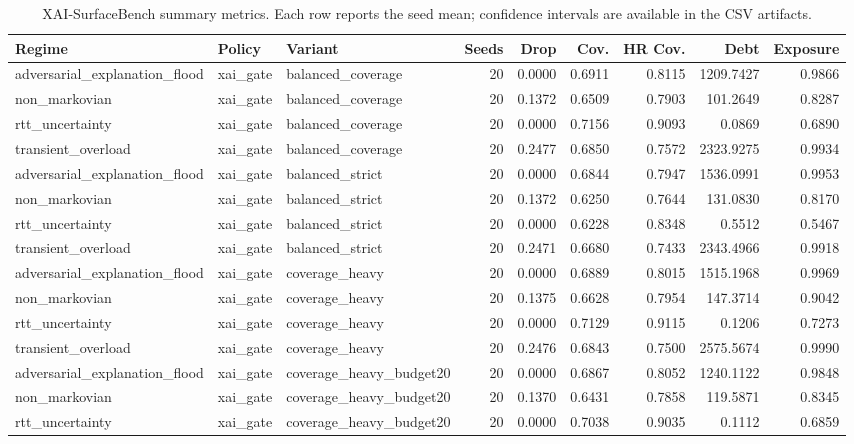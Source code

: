 \begin{table}[t]
\centering
\scriptsize
\caption{XAI-SurfaceBench summary metrics. Each row reports the seed mean; confidence intervals are available in the CSV artifacts.}
\begin{tabular}{lllrrrrrr}
\toprule
Regime & Policy & Variant & Seeds & Drop & Cov. & HR Cov. & Debt & Exposure \\
\midrule
adversarial\_explanation\_flood & xai\_gate & balanced\_coverage & 20 & 0.0000 & 0.6911 & 0.8115 & 1209.7427 & 0.9866 \\
non\_markovian & xai\_gate & balanced\_coverage & 20 & 0.1372 & 0.6509 & 0.7903 & 101.2649 & 0.8287 \\
rtt\_uncertainty & xai\_gate & balanced\_coverage & 20 & 0.0000 & 0.7156 & 0.9093 & 0.0869 & 0.6890 \\
transient\_overload & xai\_gate & balanced\_coverage & 20 & 0.2477 & 0.6850 & 0.7572 & 2323.9275 & 0.9934 \\
adversarial\_explanation\_flood & xai\_gate & balanced\_strict & 20 & 0.0000 & 0.6844 & 0.7947 & 1536.0991 & 0.9953 \\
non\_markovian & xai\_gate & balanced\_strict & 20 & 0.1372 & 0.6250 & 0.7644 & 131.0830 & 0.8170 \\
rtt\_uncertainty & xai\_gate & balanced\_strict & 20 & 0.0000 & 0.6228 & 0.8348 & 0.5512 & 0.5467 \\
transient\_overload & xai\_gate & balanced\_strict & 20 & 0.2471 & 0.6680 & 0.7433 & 2343.4966 & 0.9918 \\
adversarial\_explanation\_flood & xai\_gate & coverage\_heavy & 20 & 0.0000 & 0.6889 & 0.8015 & 1515.1968 & 0.9969 \\
non\_markovian & xai\_gate & coverage\_heavy & 20 & 0.1375 & 0.6628 & 0.7954 & 147.3714 & 0.9042 \\
rtt\_uncertainty & xai\_gate & coverage\_heavy & 20 & 0.0000 & 0.7129 & 0.9115 & 0.1206 & 0.7273 \\
transient\_overload & xai\_gate & coverage\_heavy & 20 & 0.2476 & 0.6843 & 0.7500 & 2575.5674 & 0.9990 \\
adversarial\_explanation\_flood & xai\_gate & coverage\_heavy\_budget20 & 20 & 0.0000 & 0.6867 & 0.8052 & 1240.1122 & 0.9848 \\
non\_markovian & xai\_gate & coverage\_heavy\_budget20 & 20 & 0.1370 & 0.6431 & 0.7858 & 119.5871 & 0.8345 \\
rtt\_uncertainty & xai\_gate & coverage\_heavy\_budget20 & 20 & 0.0000 & 0.7038 & 0.9035 & 0.1112 & 0.6859 \\

\end{tabular}
\end{table}

